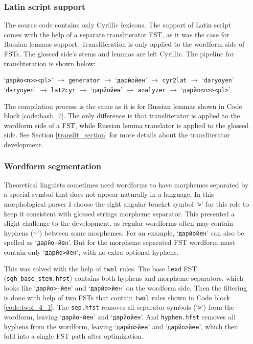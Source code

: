 \subsubsection*{Latin script support}
The source code contains only Cyrillic lexicons. The support of Latin script comes with the help of a separate transliterator FST, as it was the case for Russian lemmas support. Transliteration is only applied to the wordform side of FSTs. The glossed side's stems and lemmas are left Cyrillic. The pipeline for transliteration is shown below:

\begin{center}
\noindent `\texttt{дарйо<n>><pl>}' $\rightarrow$ \texttt{generator} $\rightarrow$ `\texttt{дарйойен}' $\rightarrow$ \texttt{cyr2lat} $\rightarrow$ `\texttt{daryoyen}'\\
\noindent `\texttt{daryoyen}' $\rightarrow$ \texttt{lat2cyr} $\rightarrow$ `\texttt{дарйойен}' $\rightarrow$ \texttt{analyzer} $\rightarrow$ `\texttt{дарйо<n>><pl>}'\\
\end{center}

The compilation process is the same as it is for Russian lemmas shown in Code block \ref{code:bash_7}. The only difference is that transliterator is applied to the wordform side of a FST, while Russian lemma translator is applied to the glossed side. See Section \ref{translit_section} for more details about the transliterator development.

\subsubsection*{Wordform segmentation} \label{morpheme_borders}
Theoretical linguists sometimes need wordforms to have morphemes separated by a special symbol that does not appear naturally in a language. In this morphological parser I choose the right angular bracket symbol '\texttt{>}' for this role to keep it consistent with glossed strings morpheme separator. This presented a slight challenge to the development, as regular wordforms often may contain hyphens (`-') between some morphemes. For an example, `\texttt{дарйойен}' can also be spelled as `\texttt{дарйо-йен}'. But for the morpheme separated FST wordform must contain only `\texttt{дарйо>йен}', with no extra optional hyphens. 

This was solved with the help of \texttt{twol} rules. The base \texttt{lexd} FST (\texttt{sgh\_base\_stem.hfst}) contains both hyphens and morpheme separators, which looks like `\texttt{дарйо>-йен}' and `\texttt{дарйо>йен}' on the wordform side. Then the filtering is done with help of two FSTs that contain \texttt{twol} rules shown in Code block \ref{code:twol_4_1}. The \texttt{sep.hfst} removes all separator symbols (`\texttt{>}') from the wordform, leaving `\texttt{дарйо-йен}' and `\texttt{дарйойен}'. And \texttt{hyphen.hfst} removes all hyphens from the wordform, leaving `\texttt{дарйо>йен}' and `\texttt{дарйо>йен}', which then fold into a single FST path after optimization.

